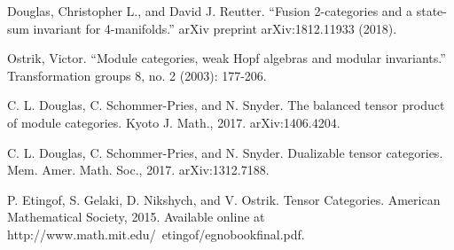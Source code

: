 \documentclass[12pt]{article}
\begin{document}
\begin{thebibliography}{1}

 Douglas, Christopher L., and David J. Reutter. ``Fusion
2-categories and a state-sum invariant for 4-manifolds.'' arXiv preprint arXiv:1812.11933 (2018).

 Ostrik, Victor. ``Module categories, weak Hopf algebras and
modular invariants.'' Transformation groups 8, no. 2 (2003): 177-206.

 C. L. Douglas, C. Schommer-Pries, and N. Snyder. The balanced tensor product of module
categories. Kyoto J. Math., 2017. arXiv:1406.4204.

 C. L. Douglas, C. Schommer-Pries, and N. Snyder. Dualizable tensor categories. Mem. Amer.
Math. Soc., 2017. arXiv:1312.7188.

 P. Etingof, S. Gelaki, D. Nikshych, and V. Ostrik. Tensor Categories. American Mathematical
Society, 2015. Available online at http://www.math.mit.edu/~etingof/egnobookfinal.pdf.

\end{thebibliography}
\end{document}
